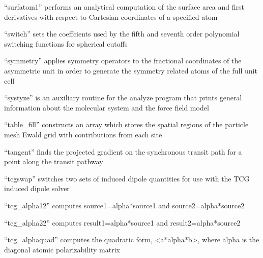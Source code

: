 \documentclass[letterpaper,11pt,english]{sphinxmanual}
\begin{document}
\sphinxAtStartPar
“surfatom1” performs an analytical computation of the surface area and first derivatives with respect to Cartesian coordinates of a specified atom

\sphinxAtStartPar
{}

\sphinxAtStartPar
“switch” sets the coeffcients used by the fifth and seventh order polynomial switching functions for spherical cutoffs

\sphinxAtStartPar
{}

\sphinxAtStartPar
“symmetry” applies symmetry operators to the fractional coordinates of the asymmetric unit in order to generate the symmetry related atoms of the full unit cell

\sphinxAtStartPar
{}

\sphinxAtStartPar
“systyze” is an auxiliary routine for the analyze program that prints general information about the molecular system and the force field model

\sphinxAtStartPar
{}

\sphinxAtStartPar
“table\_fill” constructs an array which stores the spatial regions of the particle mesh Ewald grid with contributions from each site

\sphinxAtStartPar
{}

\sphinxAtStartPar
“tangent” finds the projected gradient on the synchronous transit path for a point along the transit pathway

\sphinxAtStartPar
{}

\sphinxAtStartPar
“tcgswap” switches two sets of induced dipole quantities for use with the TCG induced dipole solver

\sphinxAtStartPar
{}

\sphinxAtStartPar
“tcg\_alpha12” computes source1=alpha*source1 and source2=alpha*source2

\sphinxAtStartPar
{}

\sphinxAtStartPar
“tcg\_alpha22” computes result1=alpha*source1 and result2=alpha*source2

\sphinxAtStartPar
{}

\sphinxAtStartPar
“tcg\_alphaquad” computes the quadratic form, \textless{}a*alpha*b\textgreater{}, where alpha is the diagonal atomic polarizability matrix
\end{document}
